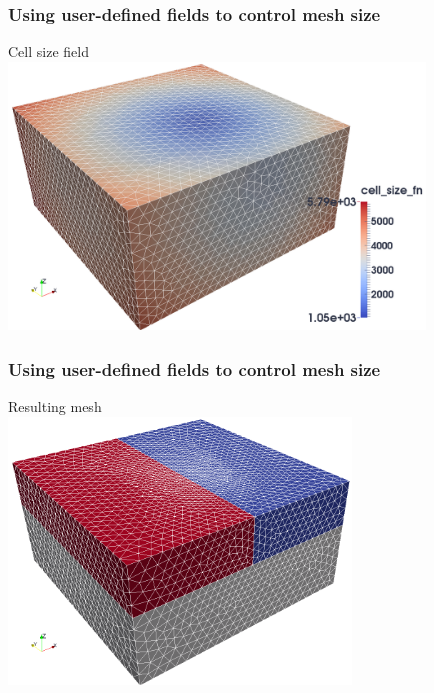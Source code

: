 \documentclass{beamer}
\begin{document}
\begin{frame}
  \frametitle{Using user-defined fields to control mesh size}
 
  Cell size field\\
  \includegraphics[height=7.1cm]{figs/cellsize_analyticfn}
 
\end{frame}
 

\begin{frame}
  \frametitle{Using user-defined fields to control mesh size}
 
  Resulting mesh\\
  \includegraphics[height=7.1cm]{figs/cellsize_analyticfn_mesh}
 
\end{frame}
 

\end{document}
